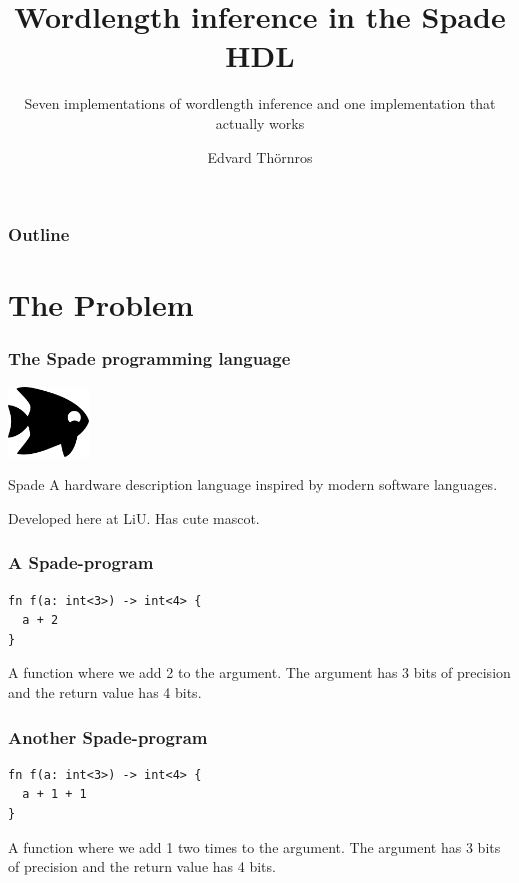 \documentclass{beamer}
\title{Wordlength inference in the Spade HDL}
\subtitle{Seven implementations of wordlength inference and one implementation that actually works}
\author{Edvard Thörnros}
\institute{Department of Electrical Engineering at Linköping University}
\begin{document}
\begin{frame}
\titlepage
\end{frame}

\begin{frame}
\frametitle{Outline}
\tableofcontents
\end{frame}

\section{The Problem}

\begin{frame}
\frametitle{The Spade programming language}
\begin{center}
\includegraphics[height=5em]{figures/spadefish.png}
\end{center}
\begin{block}{Spade}
A hardware description language inspired by modern software languages.
\end{block}
Developed here at LiU. Has cute mascot.
\end{frame}


\begin{frame}[containsverbatim]
\frametitle{A Spade-program}
\begin{center}
\begin{verbatim}
fn f(a: int<3>) -> int<4> {
  a + 2
}
\end{verbatim}
\end{center}
\vspace{1em}
A function where we add 2 to the argument. The argument has 3 bits of precision and the return value has 4 bits.
\end{frame}

\begin{frame}[containsverbatim]
\frametitle{Another Spade-program}
\begin{center}
\begin{verbatim}
fn f(a: int<3>) -> int<4> {
  a + 1 + 1
}
\end{verbatim}
\end{center}
\vspace{1em}
A function where we add 1 two times to the argument. The argument has 3 bits of precision and the return value has 4 bits.
\end{frame}
\end{document}
